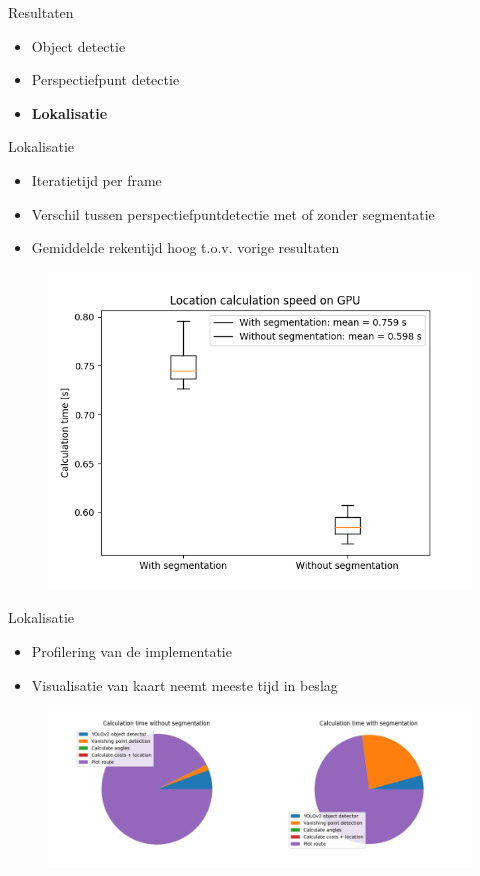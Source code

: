 \documentclass[11pt,t]{beamer}
\begin{document}
%
%
\begin{frame}[fragile]{Resultaten}
	\begin{itemize}
		\item Object detectie
		\item Perspectiefpunt detectie
		\item \textbf{Lokalisatie}
	\end{itemize}
\end{frame}

\begin{frame}[fragile]{Lokalisatie}
	\begin{itemize}
		\item Iteratietijd per frame
		\item Verschil tussen perspectiefpuntdetectie met of zonder segmentatie
		\item Gemiddelde rekentijd hoog t.o.v. vorige resultaten
	\end{itemize}

	\begin{figure}
		\centering
		\includegraphics[width=0.6\linewidth]{graphics/loc_speed.png}
	\end{figure}
\end{frame}

\begin{frame}[fragile]{Lokalisatie}
	\begin{itemize}
		\item Profilering van de implementatie
		\item Visualisatie van kaart neemt meeste tijd in beslag
	\end{itemize}

	\begin{figure}
		\centering
		\includegraphics[width=\linewidth]{graphics/loc_time.png}
	\end{figure}
\end{frame}
\end{document}
